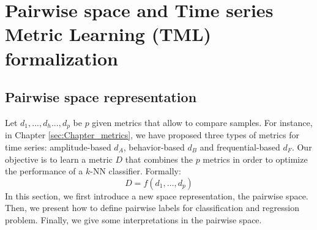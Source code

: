 \chapter{Pairwise space and Time series Metric Learning (TML) formalization}
\label{sec:TML}
\minitoc




\section{Pairwise space representation}
Let  $d_1, ..., d_h ..., d_p$ be $p$ given metrics that allow to compare samples. For instance, in Chapter \ref{sec:Chapter_metrics}, we have proposed three types of metrics for time series: amplitude-based $d_A$, behavior-based $d_B$ and frequential-based $d_F$. Our objective is to learn a metric $D$ that combines the $p$ metrics in order to optimize the performance of a $k$-NN classifier. Formally:
\begin{equation}
	D = f(d_1, \ldots , d_p)
\end{equation}
In this section, we first introduce a new space representation, the pairwise space. Then, we present how to define pairwise labels for classification and regression problem. Finally, we give some interpretations in the pairwise space. 


